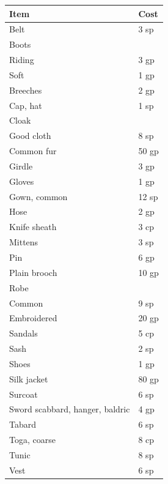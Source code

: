 \begin{multicols}{2}
\begin{minipage}{\columnwidth}
\label{clothing}
\noindent
\begin{tabular}{|p{}|p{}|}
\hline
Item	& Cost \\
\hline\hline
\rowcolor[gray]{.9}Belt	& 3 sp \\
Boots & \\
\hspace{1em}Riding	& 3 gp \\
\rowcolor[gray]{.9}\hspace{1em}Soft	& 1 gp \\
Breeches	& 2 gp \\
\rowcolor[gray]{.9}Cap, hat	& 1 sp \\
Cloak & \\
\hspace{1em}Good cloth	& 8 sp \\
\rowcolor[gray]{.9}\hspace{1em}Common fur	& 50 gp \\
Girdle	& 3 gp \\
\rowcolor[gray]{.9}Gloves	& 1 gp \\
Gown, common	& 12 sp \\
\rowcolor[gray]{.9}Hose	& 2 gp \\
Knife sheath	& 3 cp \\
\rowcolor[gray]{.9}Mittens	& 3 sp \\
Pin	& 6 gp \\
\rowcolor[gray]{.9}Plain brooch	& 10 gp \\
Robe	& \\
\hspace{1em}Common	& 9 sp \\
\rowcolor[gray]{.9}\hspace{1em}Embroidered	& 20 gp \\
Sandals	& 5 cp \\
\rowcolor[gray]{.9}Sash	& 2 sp \\
Shoes	& 1 gp \\
\rowcolor[gray]{.9}Silk jacket	& 80 gp \\
Surcoat	& 6 sp \\
\rowcolor[gray]{.9}Sword scabbard, hanger, baldric	& 4 gp \\
Tabard	& 6 sp \\
\rowcolor[gray]{.9}Toga, coarse	& 8 cp \\
Tunic	& 8 sp \\
\rowcolor[gray]{.9}Vest	& 6 sp \\
\hline
\end{tabular}


\end{minipage}
\end{multicols}
